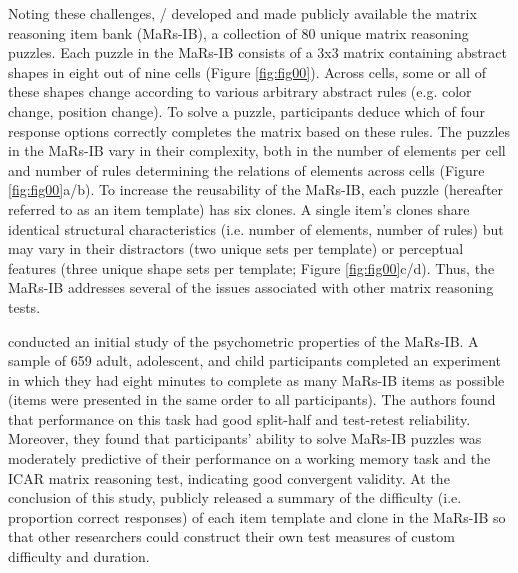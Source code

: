\documentclass[a4paper,man,natbib]{apa6}
\begin{document}
Noting these challenges, \cite{knoll2016window} / \cite{chierchia2019matrix} developed and made publicly available the matrix reasoning item bank (MaRs-IB), a collection of 80 unique matrix reasoning puzzles. Each puzzle in the MaRs-IB consists of a 3x3 matrix containing abstract shapes in eight out of nine cells (Figure \ref{fig:fig00}). Across cells, some or all of these shapes change according to various arbitrary abstract rules (e.g. color change, position change). To solve a puzzle, participants deduce which of four response options correctly completes the matrix based on these rules. The puzzles in the MaRs-IB vary in their complexity, both in the number of elements per cell and number of rules determining the relations of elements across cells (Figure \ref{fig:fig00}a/b). To increase the reusability of the MaRs-IB, each puzzle (hereafter referred to as an item template) has six clones. A single item's clones share identical structural characteristics (i.e. number of elements, number of rules) but may vary in their distractors (two unique sets per template) or perceptual features (three unique shape sets per template; Figure \ref{fig:fig00}c/d). Thus, the MaRs-IB addresses several of the issues associated with other matrix reasoning tests.   

\cite{chierchia2019matrix} conducted an initial study of the psychometric properties of the MaRs-IB. A sample of 659 adult, adolescent, and child participants completed an experiment in which they had eight minutes to complete as many MaRs-IB items as possible (items were presented in the same order to all participants). The authors found that performance on this task had good split-half and test-retest reliability. Moreover, they found that participants' ability to solve MaRs-IB puzzles was moderately predictive of their performance on a working memory task and the ICAR matrix reasoning test, indicating good convergent validity. At the conclusion of this study, \cite{chierchia2019matrix} publicly released a summary of the difficulty (i.e. proportion correct responses) of each item template and clone in the MaRs-IB so that other researchers could construct their own test measures of custom difficulty and duration.
\end{document}
